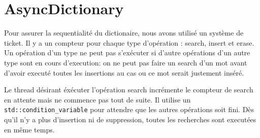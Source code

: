 \documentclass{article}
\begin{document}
\section{AsyncDictionary}
Pour assurer la sequentialité du dictionaire, nous avons utilisé un
système de ticket.
Il y a un compteur pour chaque type d'opération : search, insert et
erase.
Un opération d'un type ne peut pas s'exécuter si d'autre opérations d'un
autre type sont en cours d'execution: on ne peut pas faire un search
d'un mot avant d'avoir executé toutes les insertions au cas ou ce mot
serait justement inséré.

Le thread désirant éxécuter l'opération search incrémente le compteur de
search en attente mais ne commence pas tout de suite.
Il utilise un \texttt{std::condition\_variable} pour attendre que les
autres opérations soit fini.  Dès qu'il n'y a plus d'insertion ni de
suppression, toutes les recherches sont executées en même temps.
\end{document}
